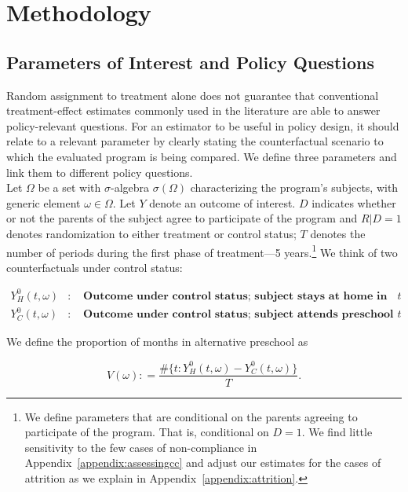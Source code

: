 \section{Methodology} \label{section:methodology}

\subsection{Parameters of Interest and Policy Questions} \label{section:methodsquestions}

\noindent Random assignment to treatment alone does not guarantee that conventional treatment-effect estimates commonly used in the literature are able to answer policy-relevant questions. For an estimator to be useful in policy design, it should relate to a relevant parameter by clearly stating the counterfactual scenario to which the evaluated program is being compared. We define three parameters and link them to different policy questions.\\ 

\noindent Let $\Omega$ be a set with $\sigma$-algebra $\sigma \left( \Omega \right)$ characterizing the program's subjects, with generic element $\omega \in \Omega$. Let $Y$ denote an outcome of interest. $D$ indicates whether or not the parents of the subject agree to participate of the program and $R | D = 1$ denotes randomization to either treatment or control status; $T$ denotes the number of periods during the first phase of treatment---5 years.\footnote{We define parameters that are conditional on the parents agreeing to participate of the program. That is, conditional on $D = 1$. We find little sensitivity to the few cases of non-compliance in Appendix~\ref{appendix:assessingcc} and adjust our estimates for the cases of attrition as we explain in Appendix~\ref{appendix:attrition}.} We think of two counterfactuals under control status: 

\begin{eqnarray}
Y_H^0 \left( t, \omega \right) &:& \textbf{ Outcome under control status; subject stays at home in period $t$} \nonumber \\ 
Y_C^0 \left( t, \omega \right) &:& \textbf{ Outcome under control status; subject attends preschool in period $t$}  \nonumber
\end{eqnarray}

\noindent We define the proportion of months in alternative preschool as 

\begin{equation}
V \left ( \omega \right) : = \frac{\# \{ t: Y_H^0 \left( t, \omega \right) - Y_C^0 \left( t, \omega \right)  \} }{T}.
\end{equation}

